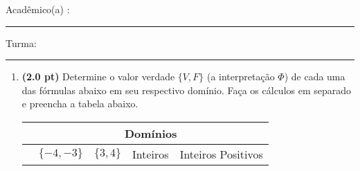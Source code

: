 \documentclass[a4paper,12pt]{article}
\begin{document}


\vskip 0.5cm Acad\^emico(a) : \rule{10cm}{0.4pt} Turma:  \rule{1cm}{0.4pt}

\begin{enumerate}

%
%
%
%
%
%
%
%


\item {\bf (2.0 pt)} Determine o valor verdade $\{V, F \}$ (a interpretação $\Phi $)
de cada uma das fórmulas abaixo em seu respectivo domínio.
Faça os cálculos em separado e preencha a tabela abaixo.
\begin{center}
\begin{tabular}{l|l|l|l|l} \hline \hline
 & \multicolumn{4}{c}{Domínios} \\ \hline
 & $\{-4,-3\}$ & $\{3,4\}$ & Inteiros & Inteiros Positivos \\ \hline


\end{tabular}
\end{center}
\end{enumerate}
\end{document}
